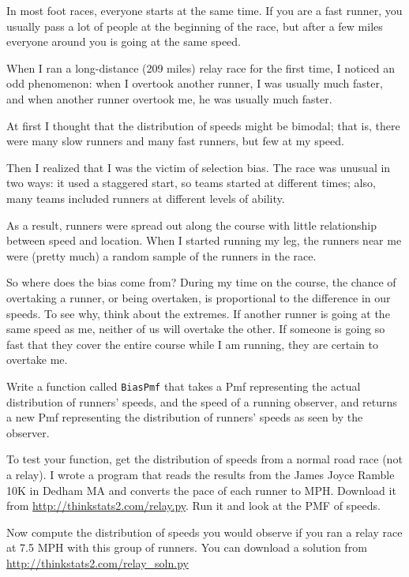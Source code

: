 \documentclass[12pt]{book}
\begin{document}
\begin{exercise}
\label{relay}

In most foot races, everyone starts at the same time.  If you are a
fast runner, you usually pass a lot of people at the beginning of the
race, but after a few miles everyone around you is going at the same
speed.

When I ran a long-distance (209 miles) relay race for the first
time, I noticed an odd phenomenon: when I overtook another runner, I
was usually much faster, and when another runner overtook me, he was
usually much faster.

At first I thought that the distribution of speeds might be bimodal;
that is, there were many slow runners and many fast runners, but few
at my speed.

Then I realized that I was the victim of selection bias.  The race
was unusual in two ways: it used a staggered start, so teams started
at different times; also, many teams included runners at different
levels of ability.  

As a result, runners were spread out along the course with little
relationship between speed and location.  When I started running my
leg, the runners near me were (pretty much) a random sample of the
runners in the race.

So where does the bias come from?  During my time on the course, the
chance of overtaking a runner, or being overtaken, is proportional to
the difference in our speeds.  To see why, think about the extremes.
If another runner is going at the same speed as me, neither of us will
overtake the other.  If someone is going so fast that they cover the
entire course while I am running, they are certain to overtake me.

Write a function called {\tt BiasPmf} that takes a Pmf representing
the actual distribution of runners' speeds, and the speed of a running
observer, and returns a new Pmf representing the distribution of
runners' speeds as seen by the observer.

To test your function, get the distribution of speeds from a
normal road race (not a relay).  I wrote a program that reads the
results from the James Joyce Ramble 10K in Dedham MA and converts the
pace of each runner to MPH.  Download it from
\url{http://thinkstats2.com/relay.py}.  Run it and look at the PMF of
speeds.

Now compute the distribution of speeds you would observe if you ran a
relay race at 7.5 MPH with this group of runners.  You can download a
solution from \url{http://thinkstats2.com/relay_soln.py}

\end{exercise}
\end{document}

